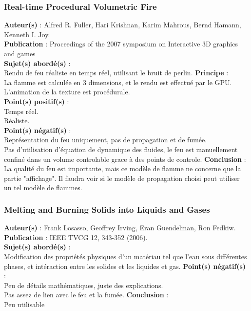 \documentclass[a4paper,10pt]{article}
\begin{document}
\subsubsection{Real-time Procedural Volumetric Fire}
\textbf{Auteur(s)} : Alfred R. Fuller, Hari Krishnan, Karim Mahrous, Bernd Hamann, Kenneth I. Joy.\\
\textbf{Publication} : Proceedings of the 2007 symposium on Interactive 3D graphics and games\\
\textbf{Sujet(s) abordé(s)} : \\
	Rendu de feu réaliste en temps réel, utilisant le bruit de perlin.
\textbf{Principe} :\\
	La flamme est calculée en 3 dimensions, et le rendu est effectué par le GPU.\\
	L'animation de la texture est procédurale.\\	
\textbf{Point(s) positif(s)} :\\
	Temps réel.\\
	Réaliste.\\
\textbf{Point(s) négatif(s)} :\\
	Représentation du feu uniquement, pas de propagation et de fumée.\\
	Pas d'utilisation d'équation de dynamique des fluides, le feu est manuellement 
	confiné dans un volume controlable grace à des points de controle.
\textbf{Conclusion} :\\
	La qualité du feu est importante, mais ce modèle de flamme ne concerne que 
	la partie "affichage". Il faudra voir si le modèle de propagation choisi 
	peut utiliser un tel modèle de flammes.


\subsubsection{Melting and Burning Solids into Liquids and Gases}
\textbf{Auteur(s)} : Frank Losasso, Geoffrey Irving, Eran Guendelman, Ron Fedkiw.\\
\textbf{Publication} : IEEE TVCG 12, 343-352 (2006).\\
\textbf{Sujet(s) abordé(s)} : \\
	Modification des propriétés physiques d'un matériau tel que l'eau sous différentes phases, et intéraction entre les solides et les liquides et gas. 
\textbf{Point(s) négatif(s)} :\\
	Peu de détails mathématiques, juste des explications.\\
	Pas assez de lien avec le feu et la fumée.
\textbf{Conclusion} :\\
	Peu utilisable
\end{document}
